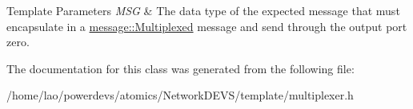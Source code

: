 \begin{DoxyTemplParams}{Template Parameters}
{\em M\+SG} & The data type of the expected message that must encapsulate in a \hyperlink{structmessage_1_1Multiplexed}{message\+::\+Multiplexed} message and send through the output port zero. \\
\hline
\end{DoxyTemplParams}


The documentation for this class was generated from the following file\+:\begin{DoxyCompactItemize}
\item 
/home/lao/powerdevs/atomics/\+Network\+D\+E\+V\+S/template/multiplexer.\+h\end{DoxyCompactItemize}
